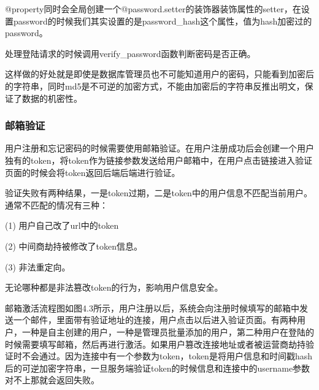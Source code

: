 @property同时会全局创建一个@password.setter的装饰器装饰属性的setter，在设置password的时候我们其实设置的是password\_hash这个属性，值为hash加密过的password。

处理登陆请求的时候调用verify\_password函数判断密码是否正确。

这样做的好处就是即使是数据库管理员也不可能知道用户的密码，只能看到加密后的字符串，同时md5是不可逆的加密方式，不能由加密后的字符串反推出明文，保证了数据的机密性。

\subsubsection{邮箱验证}

用户注册和忘记密码的时候需要使用邮箱验证。在用户注册成功后会创建一个用户独有的token，将token作为链接参数发送给用户邮箱中，在用户点击链接进入验证页面的时候会将token返回后端后端进行验证。

验证失败有两种结果，一是token过期，二是token中的用户信息不匹配当前用户。通常不匹配的情况有三种：

(1) 用户自己改了url中的token

(2) 中间商劫持被修改了token信息。

(3) 非法重定向。

无论哪种都是非法篡改token的行为，影响用户信息安全。

邮箱激活流程图如图4.3所示，用户注册以后，系统会向注册时候填写的邮箱中发送一个邮件，里面带有验证地址的连接，用户点击以后进入验证页面。有两种用户，一种是自主创建的用户，一种是管理员批量添加的用户，第二种用户在登陆的时候需要填写邮箱，然后再进行激活。如果用户篡改连接地址或者被运营商劫持验证时不会通过。因为连接中有一个参数为token，token是将用户信息和时间戳hash后的可逆加密字符串，一旦服务端验证token的时候信息和连接中的username参数对不上那就会返回失败。

